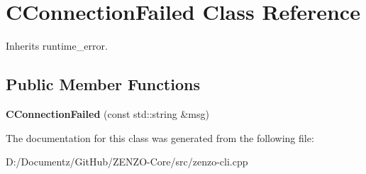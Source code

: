 \hypertarget{class_c_connection_failed}{}\section{C\+Connection\+Failed Class Reference}
\label{class_c_connection_failed}


Inherits runtime\+\_\+error.

\subsection*{Public Member Functions}
\begin{DoxyCompactItemize}
\item 
\mbox{\label{class_c_connection_failed_abcc9db4386ec901f5159c44d939c82c5}} 
{\bfseries C\+Connection\+Failed} (const std\+::string \&msg)
\end{DoxyCompactItemize}


The documentation for this class was generated from the following file\+:\begin{DoxyCompactItemize}
\item 
D\+:/\+Documentz/\+Git\+Hub/\+Z\+E\+N\+Z\+O-\/\+Core/src/zenzo-\/cli.\+cpp\end{DoxyCompactItemize}
